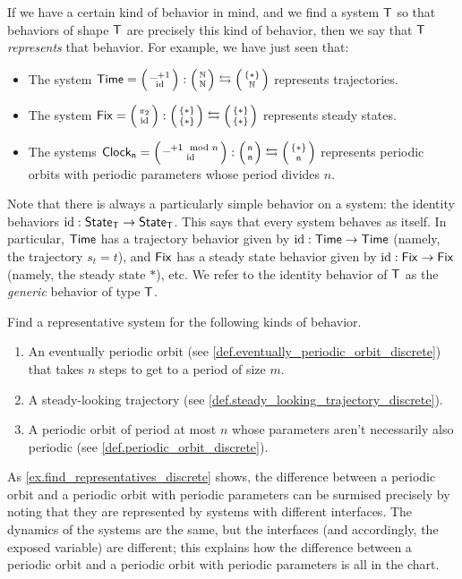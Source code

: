\documentclass[DynamicalBook]{subfiles}
\begin{document}
If we have a certain kind of behavior in mind, and we find a system $\mathsf{T}$ so
that behaviors of shape $\mathsf{T}$ are precisely this kind of behavior, then we
say that $\mathsf{T}$ \emph{represents} that behavior. For example, we have just
seen that:
\begin{itemize}
  \item The system $\Sys{Time} = \lens{\_ + 1}{\id} : \lens{\nn}{\nn} \leftrightarrows
    \lens{\{\ast\}}{\nn}$ represents trajectories.
  \item The system $\Sys{Fix} = \lens{\pi_2}{\id} : \lens{\{\ast\}}{\{\ast\}}
    \leftrightarrows \lens{\{\ast\}}{\{\ast\}}$ represents steady states.
  \item The systems $\Sys{Clock_n} = \lens{\_ + 1 \mod n}{\id} :
    \lens{\ord{n}}{\ord{n}} \leftrightarrows \lens{\{\ast\}}{\ord{n}}$
    represents periodic orbits with periodic parameters whose period divides $n$.
\end{itemize}

Note that there is always a particularly simple behavior on a system: the
identity behaviors $\mathrm{id} : \mathsf{State}_{\mathsf{T}} \to \mathsf{State}_{\mathsf{T}}$. This says that every system
behaves as itself. In particular, $\mathsf{Time}$ has a trajectory behavior given by
$\mathrm{id} : \mathsf{Time} \to \mathsf{Time}$ (namely, the trajectory $s_t = t$), and $\mathsf{Fix}$ has a steady state behavior given by $\mathrm{id} : \mathsf{Fix} \to \mathsf{Fix}$ (namely,
the steady state $\ast$), etc. We refer to the identity behavior of $\mathsf{T}$ as the \emph{generic}
behavior of type $\mathsf{T}$.

\begin{exercise}\label{ex.find_representatives_discrete}
  Find a representative system for the following kinds of behavior.
  \begin{enumerate}
    \item An eventually periodic orbit (see \cref{def.eventually_periodic_orbit_discrete}) that takes $n$ steps to get to a period
      of size $m$.
    \item A steady-looking trajectory (see \cref{def.steady_looking_trajectory_discrete}).
    \item A periodic orbit of period at most $n$ whose parameters aren't
      necessarily also periodic (see \cref{def.periodic_orbit_discrete}).
     \qedhere
  \end{enumerate}
\end{exercise}

\begin{remark}\label{rmk.periodic_parameters_versus_not}
As \cref{ex.find_representatives_discrete} shows, the difference between a
periodic orbit and a periodic orbit with periodic parameters can be surmised
precisely by noting that they are represented by systems with different
interfaces. The dynamics of the systems are the same, but the interfaces (and
accordingly, the exposed variable) are different; this explains how the
difference between a periodic orbit and a periodic orbit with periodic
parameters is all in the chart.
\end{remark}
\end{document}
